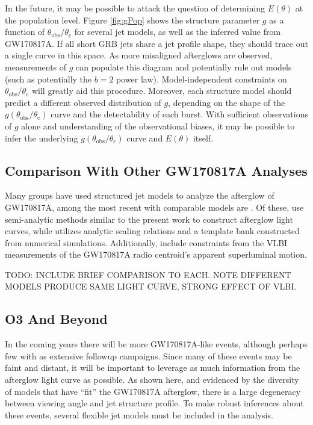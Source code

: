 \documentclass[twocolumn]{aastex62}
\newcommand{\gwbns}{GW170817A}
\newcommand{\thobs}{\ensuremath{\theta_{\mathrm{obs}}}}
\newcommand{\thC}{\ensuremath{\theta_{\mathrm{c}}}}
\begin{document}
In the future, it may be possible to attack the question of determining $E(\theta)$ at the population level.  Figure \ref{fig:gPop} shows the structure parameter $g$ as a function of $\thobs/\thC$ for several jet models, as well as the inferred value from \gwbns{}.  If all short GRB jets share a jet profile shape, they should trace out a single curve in this space.  As more misaligned afterglows are observed, measurements of $g$ can populate this diagram and potentially rule out models (such as potentially the $b=2$ power law).  Model-independent constraints on $\thobs/\thC$ will greatly aid this procedure.  Moreover, each structure model should predict a different observed distribution of $g$, depending on the shape of the $g(\thobs/\thC)$ curve and the detectability of each burst.  With sufficient observations of $g$ alone and understanding of the observational biases, it may be possible to infer the underlying $g(\thobs/\thC)$ curve and $E(\theta)$ itself.

\subsection{Comparison With Other \gwbns{} Analyses}


Many groups have used structured jet models to analyze the afterglow of \gwbns{}, among the most recent with comparable models are \citet{Hotokezaka:2018aa, Ghirlanda:2019aa, Lamb:2019aa, Wu:2018aa}.  Of these, \citet{Hotokezaka:2018aa, Ghirlanda:2019aa, Lamb:2019aa} use semi-analytic methods similar to the present work to construct afterglow light curves, while \citet{Wu:2018aa} utilizes analytic scaling relations and a template bank constructed from numerical simulations.  Additionally, \citet{Hotokezaka:2018aa, Ghirlanda:2019aa} include constraints from the VLBI measurements of the \gwbns{} radio centroid's apparent superluminal motion.

TODO: INCLUDE BRIEF COMPARISON TO EACH.  NOTE DIFFERENT MODELS PRODUCE SAME LIGHT CURVE, STRONG EFFECT OF VLBI.

\subsection{O3 And Beyond}

In the coming years there will be more \gwbns{}-like events, although perhaps few with as extensive followup campaigns.  Since many of these events may be faint and distant, it will be important to leverage as much information from the afterglow light curve as possible.  As shown here, and evidenced by the diversity of models that have ``fit'' the \gwbns{} afterglow, there is a large degeneracy between viewing angle and jet structure profile.  To make robust inferences about these events, several flexible jet models must be included in the analysis.  
\end{document}
